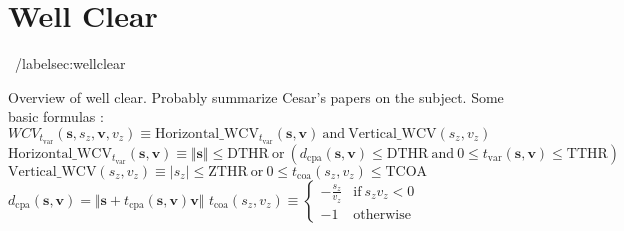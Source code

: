 \section{Well Clear}~/label{sec:wellclear}  

Overview of well clear. Probably summarize Cesar's papers on the subject.
Some basic formulas : \newline
$WCV_{t_{\mathrm{var}}} (\mathbf s,s_z,\mathbf v,v_z) \equiv \mathrm{Horizontal\_WCV_\mathit{t_{\mathrm{var}}}}(\mathbf{s},\mathbf v) ~\mathrm{and}~ \mathrm{Vertical\_WCV}(s_z,v_z)$ \newline
$\mathrm{Horizontal\_WCV_\mathit{t_{\mathrm{var}}}}(\mathbf{s},\mathbf v) \equiv \Vert \mathbf s \Vert \leq \mathrm{DTHR} ~ \mathrm{or} ~ 
(d_{\mathrm{cpa}}(\mathbf s, \mathbf v)  \leq \mathrm{DTHR} ~ \mathrm{and} ~ 0 \leq t_{\mathrm{var}}(\mathbf s, \mathbf v) \leq \mathrm{TTHR})$\newline
$\mathrm{Vertical\_WCV}(s_z,v_z) \equiv \vert s_z \vert \leq \mathrm{ZTHR} ~\mathrm{or}~ 0 \leq t_{\mathrm{coa}}(s_z,v_z) \leq \mathrm{TCOA}$\newline
$d_{\mathrm{cpa}} (\mathbf s, \mathbf v) = \Vert \mathbf s + t_{\mathrm{cpa}}(\mathbf s, \mathbf v) \mathbf v \Vert$ \newline
$t_{\mathrm{coa}}(s_z,v_z) \equiv \left\{
\begin{array}{ll}
- \frac{s_z}{v_z} & \mathrm{if} ~ {s_z}{v_z} < 0\\
- 1  & \mathrm{otherwise}
\end{array}
\right. $ \newline 
\newline 


